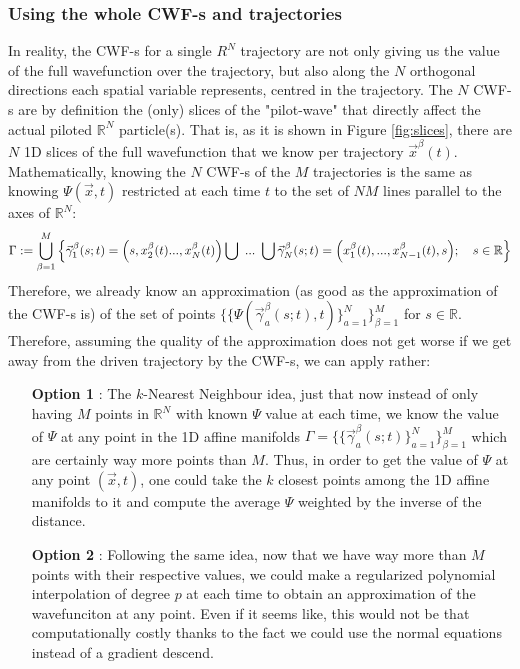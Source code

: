 \documentclass[11pt, a4paper]{article} %
\newcommand{\R}{\mathbb{R}} %
\begin{document}
\subsubsection{Using the whole CWF-s and trajectories}
In reality, the CWF-s for a single $R^N$ trajectory are not only giving us the value of the full wavefunction over the trajectory, but also along the $N$ orthogonal directions each spatial variable represents, centred in the trajectory. The $N$ CWF-s are by definition the (only) slices of the "pilot-wave" that directly affect the actual piloted $\R^N$ particle(s). That is, as it is shown in Figure \ref{fig:slices}, there are $N$ 1D slices of the full wavefunction that we know per trajectory $\vec{x}^\beta (t)$. Mathematically, knowing the $N$ CWF-s of the $M$ trajectories is the same as knowing $\Psi(\vec{x},t)$ restricted at each time $t$ to the set of $NM$ lines parallel to the axes of $\R^N$:
$$
\Gamma:=\bigcup_{\beta=1}^M\qty{\vec{\gamma}_1^\beta(s;t)=\qty(s, x_2^\beta(t) ...,x_N^\beta (t))\bigcup\  ...\ \bigcup\vec{\gamma}_N^\beta(s;t)=\qty(x_1^\beta (t),...,x_{N-1}^\beta (t), s);\quad s\in \R}
$$
Therefore, we already know an approximation (as good as the approximation of the CWF-s is) of the set of points $\{\{\Psi(\vec{\gamma}^\beta_a(s;t),t)\}_{a=1}^N\}_{\beta=1}^M$ for $s\in \R$. Therefore, assuming the quality of the approximation does not get worse if we get away from the driven trajectory by the CWF-s, we can apply rather:
\begin{enumerate}
\item[\bf Option 1]: The $k$-Nearest Neighbour idea, just that now instead of only having $M$ points in $\R^N$ with known $\Psi$ value at each time, we know the value of $\Psi$ at any point in the 1D affine manifolds $\Gamma=\{\{\vec{\gamma}^\beta_a(s;t)\}_{a=1}^N\}_{\beta=1}^M$ which are certainly way more points than $M$. Thus, in order to get the value of $\Psi$ at any point $(\vec{x},t)$, one could take the $k$ closest points among the 1D affine manifolds to it and compute the average $\Psi$ weighted by the inverse of the distance.
\item[\bf Option 2]: Following the same idea, now that we have way more than $M$ points with their respective values, we could make a regularized polynomial interpolation of degree $p$ at each time to obtain an approximation of the wavefunciton at any point. Even if it seems like, this would not be that computationally costly thanks to the fact we could use the normal equations instead of a gradient descend.
\end{enumerate}
\end{document}
